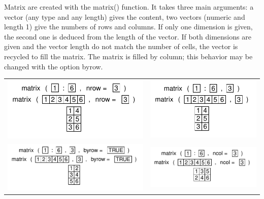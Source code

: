 \documentclass[pdflatex]{article}
\begin{document}
Matrix are created with the matrix() function. It takes three main arguments: a
vector (any type and any length) gives the content, two vectors (numeric and
length 1) give the numbers of rows and columns. If only one dimension is given,
the second one is deduced from the length of the vector. If both dimensions are
given and the vector length do not match the number of cells, the vector is
recycled to fill the matrix. The matrix is filled by column; this behavior may
be changed with the option byrow. 

\begin{tabular}{cc}
\includegraphics{matrix} & \includegraphics{matrix_arg}\\
\includegraphics{matrix_byrow} & \includegraphics{matrix_nbcol}\\

\end{tabular}
\end{document}
